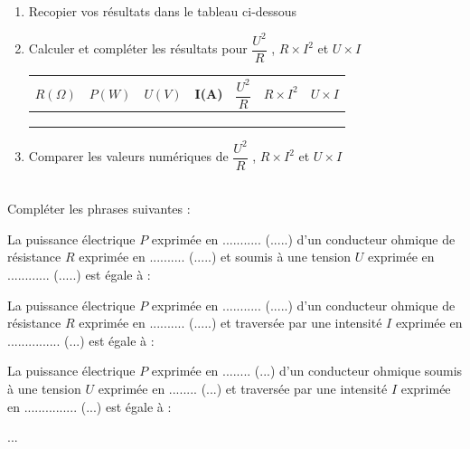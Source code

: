 \documentclass[11pt,a4paper]{article}
\begin{document}
  \\

 \begin{enumerate}[label*=2.\arabic*.]
 \item Recopier vos résultats dans le tableau ci-dessous 

 \item Calculer et compléter les résultats pour $\dfrac{U^2}{R}$ , $R \times I^2$ et $U \times I$ 

 
\begin{center}
    

    \begin{tabular}{|C{1.8cm}|C{1.8cm}|C{1.8cm}|C{1.8cm}||C{1.8cm}||C{1.8cm}||C{1.8cm}|}
         \hline
         $R(\Omega)$ & $P(W)$ &  $U(V)$ & I(A) & $\dfrac{U^2}{R}$ & $R \times I^2$ & $U \times I$ \\

         \hline
           &  &  & & & &  \\
         \hline
          &  &  & & & &  \\
         \hline
          &  &  & & & &  \\
         \hline
 
    \end{tabular}
\end{center}

\item Comparer les valeurs numériques de $\dfrac{U^2}{R}$ , $R \times I^2$ et $U \times I$ 

\vspace{3mm}
\dotfill 


\end{enumerate}


  \\[3mm]

Compléter les phrases suivantes : 
\begin{spacing}{2}
La puissance électrique $P$ exprimée en ........... (.....) d'un conducteur ohmique de résistance $R$ exprimée en .......... (.....) et soumis à une tension $U$ exprimée en ............ (.....) est égale à : 


La puissance électrique $P$ exprimée en ........... (.....) d'un conducteur ohmique de résistance $R$ exprimée en .......... (.....) et  traversée par une intensité $I$ exprimée en ............... (...) est égale à : 

La puissance électrique $P$ exprimée en ........ (...) d'un conducteur ohmique soumis à une tension $U$ exprimée en ........ (...) et  traversée par une intensité $I$ exprimée en ............... (...) est égale à : 







  ...
\end{spacing}
\end{document}
